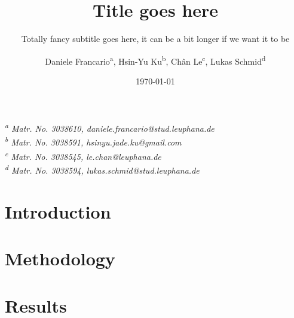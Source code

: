 \documentclass[ %
	paper=a4, %
	bibliography=totoc, %
	headings=optiontoheadandtoc
	]{scrartcl}
\title{Title goes here}
\subtitle{Totally fancy subtitle goes here, it can be a bit longer if we want it to be}
\author{Daniele Francario\textsuperscript{a}, Hsin-Yu Ku\textsuperscript{b}, Chân Le\textsuperscript{c}, Lukas Schmid\textsuperscript{d}}
\date{\today}
\begin{document}

\maketitle %
\vspace*{3cm}
\begin{center}
    \textit{\textsuperscript{a} Matr. No. 3038610, daniele.francario@stud.leuphana.de \\ \textsuperscript{b} Matr. No. 3038591, hsinyu.jade.ku@gmail.com \\ \textsuperscript{c} Matr. No. 3038545, le.chan@leuphana.de \\ \textsuperscript{d} Matr. No. 3038594, lukas.schmid@stud.leuphana.de}
\end{center}{}

\newpage

\tableofcontents %

\newpage


\listoffigures

\listoftables

\newpage

\setcounter{page}{1} %


\section{Introduction}


\section{Methodology}


\section{Results}

\end{document}
